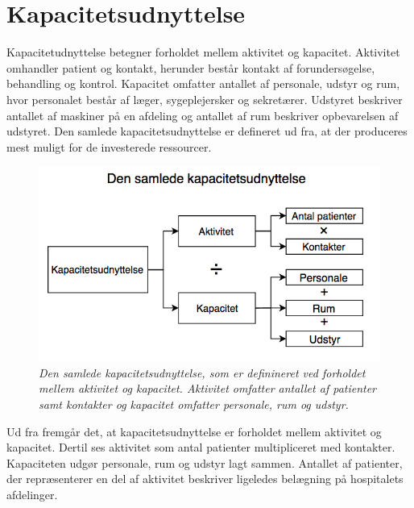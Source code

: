 \section{Kapacitetsudnyttelse} \label{kap}
Kapacitetudnyttelse betegner forholdet mellem aktivitet og kapacitet. Aktivitet omhandler patient og kontakt, herunder består kontakt af forundersøgelse, behandling og kontrol. Kapacitet omfatter antallet af personale, udstyr og rum, hvor personalet består af læger, sygeplejersker og sekretærer. Udstyret beskriver antallet af maskiner på en afdeling og antallet af rum beskriver opbevarelsen af udstyret. Den samlede kapacitetsudnyttelse er defineret ud fra, at der produceres mest muligt for de investerede ressourcer.\cite{Company2013} 

\begin{figure}[H]
	\flushleft 
	\centering
	\includegraphics[scale=.6]{figures/Kapacitetsudnyttelse.png}
	\flushleft
	\caption{\textit{Den samlede kapacitetsudnyttelse, som er definineret ved forholdet mellem aktivitet og kapacitet. Aktivitet omfatter antallet af patienter samt kontakter og kapacitet omfatter personale, rum og udstyr.}\cite{Company2013}}
	\label{kapacitet}
\end{figure}

\noindent
Ud fra  fremgår det, at kapacitetsudnyttelse er forholdet mellem aktivitet og kapacitet. Dertil ses aktivitet som antal patienter multipliceret med kontakter. Kapaciteten udgør personale, rum og udstyr lagt sammen. Antallet af patienter, der repræsenterer en del af aktivitet beskriver ligeledes belægning på hospitalets afdelinger.\cite{Company2013} 

